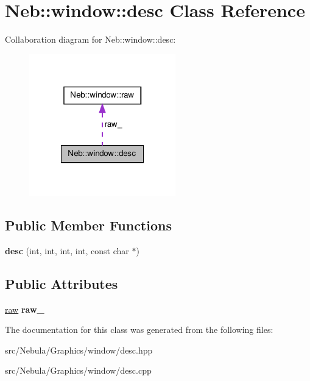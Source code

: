 \hypertarget{classNeb_1_1window_1_1desc}{\section{\-Neb\-:\-:window\-:\-:desc \-Class \-Reference}
\label{classNeb_1_1window_1_1desc}
}


\-Collaboration diagram for \-Neb\-:\-:window\-:\-:desc\-:\nopagebreak
\begin{figure}[H]
\begin{center}
\leavevmode
\includegraphics[width=180pt]{classNeb_1_1window_1_1desc__coll__graph}
\end{center}
\end{figure}
\subsection*{\-Public \-Member \-Functions}
\begin{DoxyCompactItemize}
\item 
\hypertarget{classNeb_1_1window_1_1desc_ab63aad03d901472bc8fcaffce4dc84de}{{\bfseries desc} (int, int, int, int, const char $\ast$)}\label{classNeb_1_1window_1_1desc_ab63aad03d901472bc8fcaffce4dc84de}

\end{DoxyCompactItemize}
\subsection*{\-Public \-Attributes}
\begin{DoxyCompactItemize}
\item 
\hypertarget{classNeb_1_1window_1_1desc_a5261a160f4d84f35241fcd6b5d1540e7}{\hyperlink{structNeb_1_1window_1_1raw}{raw} {\bfseries raw\-\_\-}}\label{classNeb_1_1window_1_1desc_a5261a160f4d84f35241fcd6b5d1540e7}

\end{DoxyCompactItemize}


\-The documentation for this class was generated from the following files\-:\begin{DoxyCompactItemize}
\item 
src/\-Nebula/\-Graphics/window/desc.\-hpp\item 
src/\-Nebula/\-Graphics/window/desc.\-cpp\end{DoxyCompactItemize}
